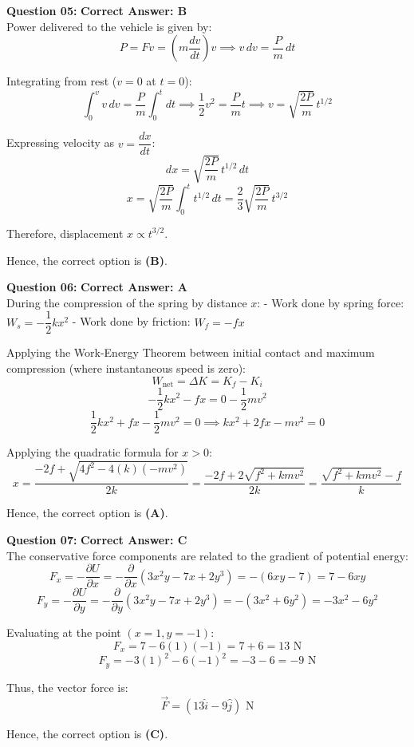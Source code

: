 \documentclass[11pt,a4paper]{article}
\begin{document}
\begin{tcolorbox}[solbox]
\textbf{\textcolor{primaryDark}{Question 05:}} \hfill \textbf{\textcolor{l1Green}{Correct Answer: B}}\\
\vspace{4pt}
Power delivered to the vehicle is given by:
$$P = F v = \left(m \frac{dv}{dt}\right) v \implies v\, dv = \frac{P}{m}\, dt$$

Integrating from rest ($v=0$ at $t=0$):
$$\int_0^v v\, dv = \frac{P}{m} \int_0^t dt \implies \frac{1}{2}v^2 = \frac{P}{m}t \implies v = \sqrt{\frac{2P}{m}}\, t^{1/2}$$

Expressing velocity as $v = \dfrac{dx}{dt}$:
$$dx = \sqrt{\frac{2P}{m}}\, t^{1/2}\, dt$$
$$x = \sqrt{\frac{2P}{m}} \int_0^t t^{1/2}\, dt = \frac{2}{3}\sqrt{\frac{2P}{m}}\, t^{3/2}$$

Therefore, displacement $x \propto t^{3/2}$.

Hence, the correct option is \textbf{(B)}.
\end{tcolorbox}

\begin{tcolorbox}[solbox]
\textbf{\textcolor{primaryDark}{Question 06:}} \hfill \textbf{\textcolor{l1Green}{Correct Answer: A}}\\
\vspace{4pt}
During the compression of the spring by distance $x$:
- Work done by spring force: $W_s = -\dfrac{1}{2}kx^2$
- Work done by friction: $W_f = -fx$

Applying the Work-Energy Theorem between initial contact and maximum compression (where instantaneous speed is zero):
$$W_{\text{net}} = \Delta K = K_f - K_i$$
$$-\frac{1}{2}kx^2 - fx = 0 - \frac{1}{2}mv^2$$
$$\frac{1}{2}kx^2 + fx - \frac{1}{2}mv^2 = 0 \implies kx^2 + 2fx - mv^2 = 0$$

Applying the quadratic formula for $x > 0$:
$$x = \frac{-2f + \sqrt{4f^2 - 4(k)(-mv^2)}}{2k} = \frac{-2f + 2\sqrt{f^2 + kmv^2}}{2k} = \frac{\sqrt{f^2 + kmv^2} - f}{k}$$

Hence, the correct option is \textbf{(A)}.
\end{tcolorbox}

\begin{tcolorbox}[solbox]
\textbf{\textcolor{primaryDark}{Question 07:}} \hfill \textbf{\textcolor{l1Green}{Correct Answer: C}}\\
\vspace{4pt}
The conservative force components are related to the gradient of potential energy:
$$F_x = -\frac{\partial U}{\partial x} = -\frac{\partial}{\partial x}(3x^2 y - 7x + 2y^3) = -(6xy - 7) = 7 - 6xy$$
$$F_y = -\frac{\partial U}{\partial y} = -\frac{\partial}{\partial y}(3x^2 y - 7x + 2y^3) = -(3x^2 + 6y^2) = -3x^2 - 6y^2$$

Evaluating at the point $(x=1, y=-1)$:
$$F_x = 7 - 6(1)(-1) = 7 + 6 = 13\text{ N}$$
$$F_y = -3(1)^2 - 6(-1)^2 = -3 - 6 = -9\text{ N}$$

Thus, the vector force is:
$$\vec{F} = (13\hat{i} - 9\hat{j})\text{ N}$$

Hence, the correct option is \textbf{(C)}.
\end{tcolorbox}
\end{document}
